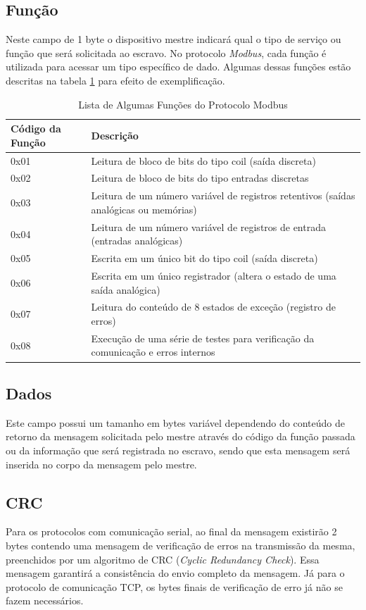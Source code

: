 \subsection{Função}

Neste campo de 1 byte o dispositivo mestre indicará qual o tipo de serviço ou função que será solicitada ao escravo. No protocolo \textit{Modbus}, cada função é utilizada para acessar um tipo específico de dado. Algumas dessas funções estão descritas na tabela \ref{tab:tabela_funcoes_modbus} para efeito de exemplificação.


\begin{table}[H]
\centering
\caption{Lista de Algumas Funções do Protocolo Modbus}
\label{tab:tabela_funcoes_modbus}
\begin{tabular}{| l | m{11cm} |}
\hline
\textbf{Código da Função} & {\center \textbf{Descrição}} \\ [10pt]
\hline
0x01 & Leitura de bloco de bits do tipo coil (saída discreta) \\ 
\hline
0x02 & Leitura de bloco de bits do tipo entradas discretas \\ 
\hline
0x03 & Leitura de um número variável de registros retentivos (saídas analógicas ou memórias) \\ 
\hline
0x04 & Leitura de um número variável de registros de entrada (entradas analógicas)\\ 
\hline
0x05 & Escrita em um único bit do tipo coil (saída discreta) \\ 
\hline
0x06 & Escrita em um único registrador (altera o estado de uma saída analógica)\\ 
\hline
0x07 & Leitura do conteúdo de 8 estados de exceção (registro de erros) \\ 
\hline
0x08 & Execução de uma série de testes para verificação da comunicação e erros internos\\ 
\hline
\end{tabular}
\end{table}

\subsection{Dados}

Este campo possui um tamanho em bytes variável dependendo do conteúdo de retorno da mensagem solicitada pelo mestre através do código da função passada ou da informação que será registrada no escravo, sendo que esta mensagem será inserida no corpo da mensagem pelo mestre.

\subsection{CRC}

Para os protocolos com comunicação serial, ao final da mensagem existirão 2 bytes contendo uma mensagem de verificação de erros na transmissão da mesma, preenchidos por um algoritmo de CRC (\textit{Cyclic Redundancy Check}). Essa mensagem garantirá a consistência do envio completo da mensagem.
Já para o protocolo de comunicação TCP, os bytes finais de verificação de erro já não se fazem necessários.


